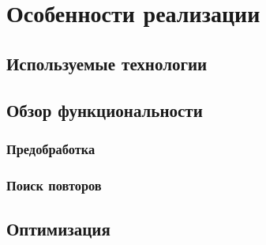 \documentclass[14pt]{matmex-diploma-custom}
\begin{document}
\section{Особенности реализации}

\subsection{Используемые технологии}

\subsection{Обзор функциональности}

\subsubsection{Предобработка}

\subsubsection{Поиск повторов}

\subsection{Оптимизация}






\end{document}
